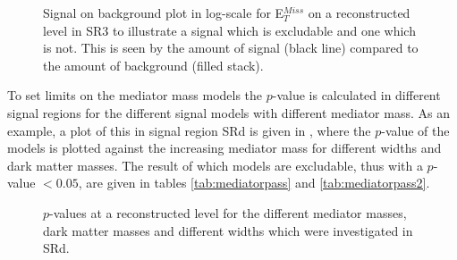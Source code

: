 \begin{figure}[H] %
    \hfill
    \caption{Signal on background plot in log-scale for E$^{Miss}_T$ on a reconstructed level in SR3 to illustrate a signal which is excludable and one which is not. This is seen by the amount of signal (black line) compared to the amount of background (filled stack).}
    \label{fig:sigback}
  \end{figure}

To set limits on the mediator mass models the $p$-value is calculated in different signal regions for the different signal models with different mediator mass. As an example, a plot of this in signal region SRd is given in , where the $p$-value of the models is plotted against the increasing mediator mass for different widths and dark matter masses. The result of which models are excludable, thus with a $p$-value $<0.05$, are given in tables \ref{tab:mediatorpass} and \ref{tab:mediatorpass2}.

 \begin{figure}[H] %
    \hfill
    \caption{$p$-values at a reconstructed level for the different mediator masses, dark matter masses and different widths which were investigated in SRd.}
    \label{fig:modelex}
  \end{figure}



